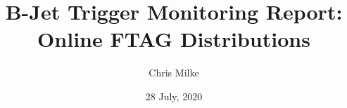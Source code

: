 \documentclass{beamer}
\begin{document}
    \title{B-Jet Trigger Monitoring Report: Online FTAG Distributions}
    \author{Chris Milke}
    \date{28 July, 2020}

    \frame{\titlepage}

    
    
\end{document}
